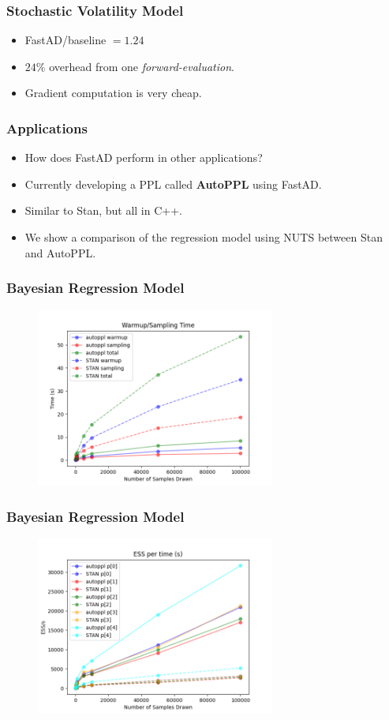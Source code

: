 \begin{frame}
\frametitle{Stochastic Volatility Model}
\begin{itemize}
    
\item FastAD/baseline $= 1.24$
\item $24\%$ overhead from one \emph{forward-evaluation}.
\item Gradient computation is very cheap.

\end{itemize}
\end{frame}

\begin{frame}
\frametitle{Applications}
\begin{itemize}
    
\item How does FastAD perform in other applications?
\item Currently developing a PPL called \textbf{AutoPPL} using FastAD.\@
\item Similar to Stan, but all in C++.
\item We show a comparison of the regression model using NUTS
    between Stan and AutoPPL.\@

\end{itemize}
\end{frame}

\begin{frame}
\frametitle{Bayesian Regression Model}
\begin{figure}
    \includegraphics[width=0.7\textwidth]{figs/runtime.png}
\end{figure}
\end{frame}

\begin{frame}
\frametitle{Bayesian Regression Model}
\begin{figure}
    \includegraphics[width=0.7\textwidth]{figs/ess_s.png}
\end{figure}
\end{frame}
